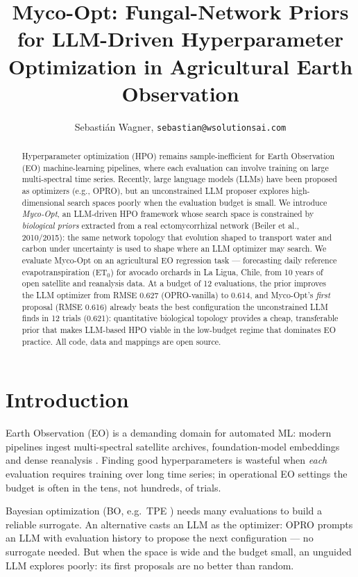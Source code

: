 \documentclass[11pt]{article}
\title{Myco-Opt: Fungal-Network Priors for LLM-Driven Hyperparameter
Optimization in Agricultural Earth Observation}
\author[1]{Sebastián Wagner, \texttt{sebastian@wsolutionsai.com}}
\affil[1]{Wagner Solutions AI (independent researcher)}
\begin{document}
\maketitle

\begin{abstract}
Hyperparameter optimization (HPO) remains sample-inefficient for Earth
Observation (EO) machine-learning pipelines, where each evaluation can involve
training on large multi-spectral time series. Recently, large language models
(LLMs) have been proposed as optimizers (e.g., OPRO), but an unconstrained LLM
proposer explores high-dimensional search spaces poorly when the evaluation
budget is small. We introduce \emph{Myco-Opt}, an LLM-driven HPO framework whose
search space is constrained by \emph{biological priors} extracted from a real
ectomycorrhizal network (Beiler et al., 2010/2015): the same network topology
that evolution shaped to transport water and carbon under uncertainty is used to
shape where an LLM optimizer may search. We evaluate Myco-Opt on an agricultural
EO regression task --- forecasting daily reference evapotranspiration (ET$_0$)
for avocado orchards in La Ligua, Chile, from 10 years of open satellite and
reanalysis data. At a budget of 12 evaluations, the prior improves the LLM
optimizer from RMSE 0.627 (OPRO-vanilla) to 0.614, and Myco-Opt's \emph{first}
proposal (RMSE 0.616) already beats the best configuration the unconstrained
LLM finds in 12 trials (0.621): quantitative biological topology provides a
cheap, transferable prior that makes LLM-based HPO viable in the low-budget
regime that dominates EO practice. All code, data and mappings are open source.
\end{abstract}

\section{Introduction}
\label{sec:intro}

Earth Observation (EO) is a demanding domain for automated ML: modern pipelines
ingest multi-spectral satellite archives, foundation-model embeddings and dense
reanalysis \citep{tuia2021,ruwurm2023}. Finding good hyperparameters is wasteful
when \emph{each} evaluation requires training over long time series; in
operational EO settings the budget is often in the tens, not hundreds, of
trials.

Bayesian optimization (BO, e.g.\ TPE \citep{bergstra2011}) needs many
evaluations to build a reliable surrogate. An alternative casts an LLM as the
optimizer: OPRO \citep{yang2024opro} prompts an LLM with evaluation history to
propose the next configuration --- no surrogate needed. But when the space is
wide and the budget small, an unguided LLM explores poorly: its first proposals
are no better than random.
\end{document}
